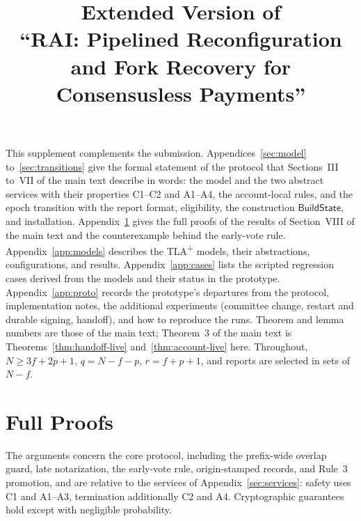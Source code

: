 \documentclass[conference]{IEEEtran}
\newcommand{\Build}{\mathsf{BuildState}}
\begin{document}

\title{Extended Version of\\``RAI: Pipelined Reconfiguration and Fork Recovery for Consensusless Payments''}
\author{}
\maketitle

\noindent
This supplement complements the submission. Appendices~\ref{sec:model} to~\ref{sec:transitions} give the formal statement of the protocol that Sections~III to~VII of the main text describe in words: the model and the two abstract services with their properties C1--C2 and A1--A4, the account-local rules, and the epoch transition with the report format, eligibility, the construction $\Build$, and installation. Appendix~\ref{app:proofs} gives the full proofs of the results of Section~VIII of the main text and the counterexample behind the early-vote rule. Appendix~\ref{app:models} describes the TLA\textsuperscript{+} models, their abstractions, configurations, and results. Appendix~\ref{app:cases} lists the scripted regression cases derived from the models and their status in the prototype. Appendix~\ref{app:proto} records the prototype's departures from the protocol, implementation notes, the additional experiments (committee change, restart and durable signing, handoff), and how to reproduce the runs. Theorem and lemma numbers are those of the main text; Theorem~3 of the main text is Theorems~\ref{thm:handoff-live} and~\ref{thm:account-live} here. Throughout, $N\ge3f+2p+1$, $q=N-f-p$, $r=f+p+1$, and reports are selected in sets of $N-f$.

\appendices




\section{Full Proofs}
\label{app:proofs}
\label{sec:correctness}
The arguments concern the core protocol, including the prefix-wide overlap guard, late notarization, the early-vote rule, origin-stamped records, and Rule~3 promotion, and are relative to the services of Appendix~\ref{sec:services}: safety uses C1 and A1--A3, termination additionally C2 and A4. Cryptographic guarantees hold except with negligible probability.
\end{document}
